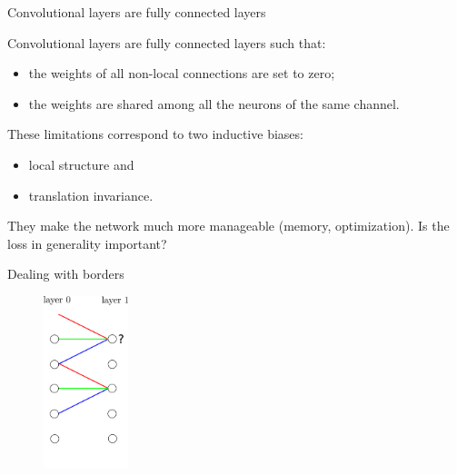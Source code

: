 \documentclass[xcolor=pdftex,dvipsnames,table,mathserif]{beamer}
\begin{document}
\begin{frame}{Convolutional layers are fully connected layers}

  Convolutional layers are fully connected layers such that:
  \begin{itemize}
  \item the weights of all non-local connections are set to zero;
  \item the weights are shared among all the neurons of the same channel.
  \end{itemize}

  These limitations correspond to two inductive biases:

\begin{itemize}
\item local structure and
\item translation invariance.
\end{itemize}

  They make the network much more manageable (memory, optimization). Is the loss in generality important?

\end{frame}

\begin{frame}{Dealing with borders}

  \begin{figure}
    \includegraphics[height=5cm]{conv_border_effect}
  \end{figure}

\end{frame}
\end{document}
